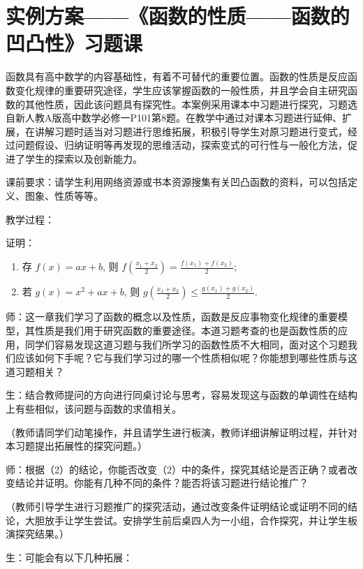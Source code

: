 \chapter{实例方案——《函数的性质——函数的凹凸性》习题课}

函数具有高中数学的内容基础性，有着不可替代的重要位置。函数的性质是反应函数变化规律的重要研究途径，学生应该掌握函数的一般性质，并且学会自主研究函数的其他性质，因此该问题具有探究性。本案例采用课本中习题进行探究，习题选自新人教A版高中数学必修一P101第8题。在教学中通过对课本习题进行延伸、扩展，在讲解习题时适当对习题进行思维拓展，积极引导学生对原习题进行变式，经过问题假设、归纳证明等再发现的思维活动，探索变式的可行性与一般化方法，促进了学生的探索以及创新能力。

课前要求：请学生利用网络资源或书本资源搜集有关凹凸函数的资料，可以包括定义、图象、性质等等。

教学过程：

证明：

\begin{enumerate}[(1)]
  \item 存 $f(x) = a x + b$, 则 $f\left(\frac{x_{1}+x_{2}}{2}\right)=\frac{f\left(x_{1}\right)+f\left(x_{2}\right)}{2}$;
  \item 若 $g(x)=x^{2}+a x+b$, 则 $g\left(\frac{x_{1}+x_{2}}{2}\right) \leq \frac{g\left(x_{1}\right)+g\left(x_{2}\right)}{2}$.
\end{enumerate}

师：这一章我们学习了函数的概念以及性质，函数是反应事物变化规律的重要模型，其性质是我们用于研究函数的重要途径。本道习题考查的也是函数性质的应用，同学们容易发现这道习题与我们所学习的函数性质不大相同，面对这个习题我们应该如何下手呢？它与我们学习过的哪一个性质相似呢？你能想到哪些性质与这道习题相关？

生：结合教师提问的方向进行同桌讨论与思考，容易发现这与函数的单调性在结构上有些相似，该问题与函数的求值相关。

（教师请同学们动笔操作，并且请学生进行板演，教师详细讲解证明过程，并针对本习题提出拓展性的探究问题。）

师：根据（2）的结论，你能否改变（2）中的条件，探究其结论是否正确？或者改变结论并证明。你能有几种不同的条件？能否将该习题进行结论推广？

（教师引导学生进行习题推广的探究活动，通过改变条件证明结论或证明不同的结论，大胆放手让学生尝试。安排学生前后桌四人为一小组，合作探究，并让学生板演探究结果。）

生：可能会有以下几种拓展：

